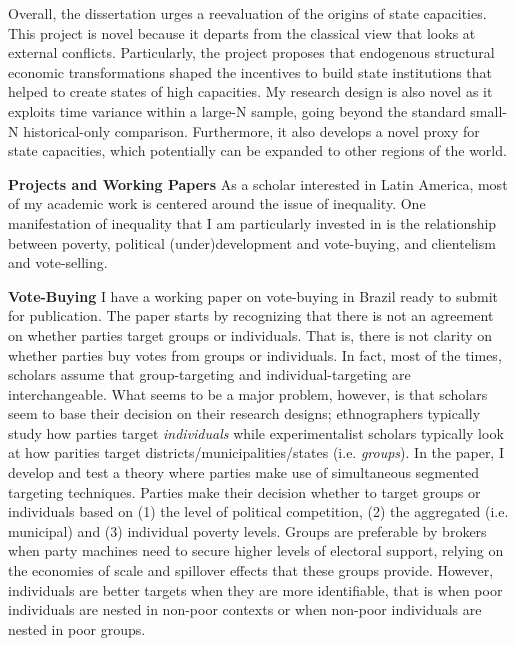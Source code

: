 \documentclass[11pt]{letter} %
\begin{document}
\begin{letter}{}
Overall, the dissertation urges a reevaluation of the origins of state capacities. This project is novel because it departs from the classical view that looks at external conflicts. Particularly, the project proposes that endogenous structural economic transformations shaped the incentives to build state institutions that helped to create states of high capacities. My research design is also novel as it exploits time variance within a large-N sample, going beyond the standard small-N historical-only comparison. Furthermore, it also develops a novel proxy for state capacities, which potentially can be expanded to other regions of the world.


{\bf Projects and Working Papers} As a scholar interested in Latin America, most of my academic work is centered around the issue of inequality. One manifestation of inequality that I am particularly invested in is the relationship between poverty, political (under)development and vote-buying, and clientelism and vote-selling. 

{\bf Vote-Buying} I have a working paper on vote-buying in Brazil ready to submit for publication. The paper starts by recognizing that there is not an agreement on whether parties target groups or individuals. That is, there is not clarity on whether parties buy votes from groups or individuals. In fact, most of the times, scholars assume that group-targeting and individual-targeting are interchangeable. What seems to be a major problem, however, is that scholars seem to base their decision on their research designs; ethnographers typically study how parties target \emph{individuals} while experimentalist scholars typically look at how parities target districts/municipalities/states (i.e. \emph{groups}). In the paper, I develop and test a theory where parties make use of simultaneous segmented targeting techniques. Parties make their decision whether to target groups or individuals based on (1) the level of political competition, (2) the aggregated (i.e. municipal) and  (3) individual poverty levels. Groups are preferable by brokers when party machines need to secure higher levels of electoral support, relying on the economies of scale and spillover effects that these groups provide. However, individuals are better targets when they are more identifiable, that is when poor individuals are nested in non-poor contexts or when non-poor individuals are nested in poor groups.


\end{letter}
\end{document}
